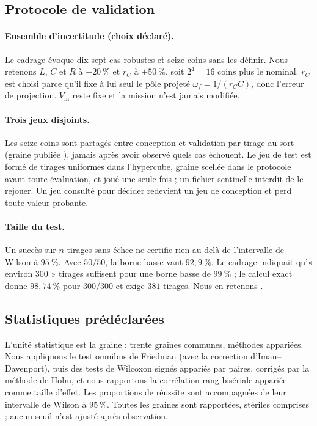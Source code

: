 \subsection{Protocole de validation}
\label{sec:validation}

\paragraph{Ensemble d'incertitude (choix déclaré).}
Le cadrage évoque dix-sept cas robustes et seize coins sans les définir. Nous
retenons $L$, $C$ et $R$ à $\pm20~\%$ et $r_C$ à $\pm50~\%$, soit $2^4=16$
coins plus le nominal. $r_C$ est choisi parce qu'il fixe à lui seul le pôle
projeté $\omega_f=1/(r_CC)$, donc l'erreur de projection. $V_\mathrm{in}$ reste
fixe et la mission n'est jamais modifiée.

\paragraph{Trois jeux disjoints.}
Les seize coins sont partagés entre conception et validation par tirage au
sort (graine publiée \ChiffreGraineSplit), jamais après avoir observé quels
cas échouent. Le jeu de test est formé de tirages uniformes dans
l'hypercube, graine \ChiffreGraineTest{} scellée dans le protocole avant toute
évaluation, et joué une seule fois ; un fichier sentinelle interdit de le
rejouer. Un jeu consulté pour décider redevient un jeu de conception et perd
toute valeur probante.

\paragraph{Taille du test.}
Un succès sur $n$ tirages sans échec ne certifie rien au-delà de l'intervalle
de Wilson à $95~\%$. Avec $50/50$, la borne basse vaut $92{,}9~\%$. Le cadrage
indiquait qu'« environ 300 » tirages suffisent pour une borne basse de
$99~\%$ ; le calcul exact donne $98{,}74~\%$ pour $300/300$ et exige
$381$ tirages. Nous en retenons \ChiffreNTest.

\subsection{Statistiques prédéclarées}
\label{sec:stats}

L'unité statistique est la graine : trente graines communes, méthodes
appariées. Nous appliquons le test omnibus de Friedman (avec la correction
d'Iman--Davenport), puis des tests de Wilcoxon signés appariés par paires,
corrigés par la méthode de Holm, et nous rapportons la corrélation
rang-bisériale appariée comme taille d'effet. Les proportions de réussite sont
accompagnées de leur intervalle de Wilson à $95~\%$. Toutes les graines sont
rapportées, stériles comprises ; aucun seuil n'est ajusté après observation.
